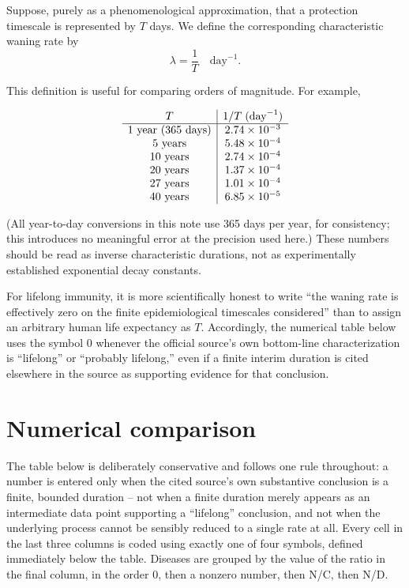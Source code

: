 \documentclass[11pt]{article}
\begin{document}
Suppose, purely as a phenomenological approximation, that a protection
timescale is represented by $T$ days. We define the corresponding
characteristic waning rate by
\[
       \boxed{\lambda = \frac{1}{T}\quad \mathrm{day}^{-1}}.
\]

This definition is useful for comparing orders of magnitude. For example,

\[
\begin{array}{c|c}
T & 1/T\;(\mathrm{day}^{-1})\\
\hline
1\ {\rm year\ (365\ days)} & 2.74\times 10^{-3}\\
5\ {\rm years} & 5.48\times 10^{-4}\\
10\ {\rm years} & 2.74\times 10^{-4}\\
20\ {\rm years} & 1.37\times 10^{-4}\\
27\ {\rm years} & 1.01\times 10^{-4}\\
40\ {\rm years} & 6.85\times 10^{-5}
\end{array}
\]

(All year-to-day conversions in this note use 365 days per year, for
consistency; this introduces no meaningful error at the precision used
here.) These numbers should be read as inverse characteristic durations,
not as experimentally established exponential decay constants.

For lifelong immunity, it is more scientifically honest to write ``the
waning rate is effectively zero on the finite epidemiological timescales
considered'' than to assign an arbitrary human life expectancy as $T$.
Accordingly, the numerical table below uses the symbol $0$ whenever the
official source's own bottom-line characterization is ``lifelong'' or
``probably lifelong,'' even if a finite interim duration is cited elsewhere
in the source as supporting evidence for that conclusion.

\section{Numerical comparison}

The table below is deliberately conservative and follows one rule
throughout: a number is entered only when the cited source's own
substantive conclusion is a finite, bounded duration -- not when a finite
duration merely appears as an intermediate data point supporting a
``lifelong'' conclusion, and not when the underlying process cannot be
sensibly reduced to a single rate at all. Every cell in the last three
columns is coded using exactly one of four symbols, defined immediately
below the table. Diseases are grouped by the value of the ratio in the
final column, in the order $0$, then a nonzero number, then N/C, then N/D.
\end{document}
